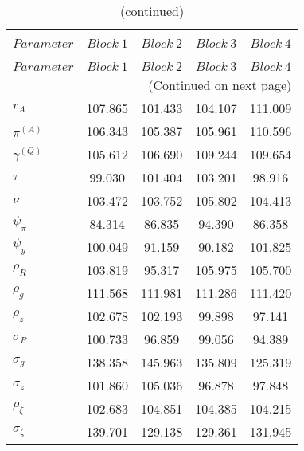  
\begin{center}
\begin{longtable}{lcccc} 
\caption{MCMC Inefficiency factors per block}\\
 \label{Table:MCMC_inefficiency_factors}\\
\toprule 
$Parameter         $	 & 	 $     Block~1$	 & 	 $     Block~2$	 & 	 $     Block~3$	 & 	 $     Block~4$\\
\midrule \endfirsthead 
\caption{(continued)}\\
 \toprule \\ 
$Parameter         $	 & 	 $     Block~1$	 & 	 $     Block~2$	 & 	 $     Block~3$	 & 	 $     Block~4$\\
\midrule \endhead 
\midrule \multicolumn{5}{r}{(Continued on next page)} \\ \bottomrule \endfoot 
\bottomrule \endlastfoot 
$ {r_{A}}          $	 & 	     107.865	 & 	     101.433	 & 	     104.107	 & 	     111.009 \\ 
$ {\pi^{(A)}}      $	 & 	     106.343	 & 	     105.387	 & 	     105.961	 & 	     110.596 \\ 
$ {\gamma^{(Q)}}   $	 & 	     105.612	 & 	     106.690	 & 	     109.244	 & 	     109.654 \\ 
$ {\tau}           $	 & 	      99.030	 & 	     101.404	 & 	     103.201	 & 	      98.916 \\ 
$ {\nu}            $	 & 	     103.472	 & 	     103.752	 & 	     105.802	 & 	     104.413 \\ 
$ {\psi_\pi}       $	 & 	      84.314	 & 	      86.835	 & 	      94.390	 & 	      86.358 \\ 
$ {\psi_y}         $	 & 	     100.049	 & 	      91.159	 & 	      90.182	 & 	     101.825 \\ 
$ {\rho_R}         $	 & 	     103.819	 & 	      95.317	 & 	     105.975	 & 	     105.700 \\ 
$ {\rho_{g}}       $	 & 	     111.568	 & 	     111.981	 & 	     111.286	 & 	     111.420 \\ 
$ {\rho_z}         $	 & 	     102.678	 & 	     102.193	 & 	      99.898	 & 	      97.141 \\ 
$ {\sigma_R}       $	 & 	     100.733	 & 	      96.859	 & 	      99.056	 & 	      94.389 \\ 
$ {\sigma_{g}}     $	 & 	     138.358	 & 	     145.963	 & 	     135.809	 & 	     125.319 \\ 
$ {\sigma_z}       $	 & 	     101.860	 & 	     105.036	 & 	      96.878	 & 	      97.848 \\ 
$ {\rho_\zeta}     $	 & 	     102.683	 & 	     104.851	 & 	     104.385	 & 	     104.215 \\ 
$ {\sigma_\zeta}   $	 & 	     139.701	 & 	     129.138	 & 	     129.361	 & 	     131.945 \\ 
\end{longtable}
 \end{center}
